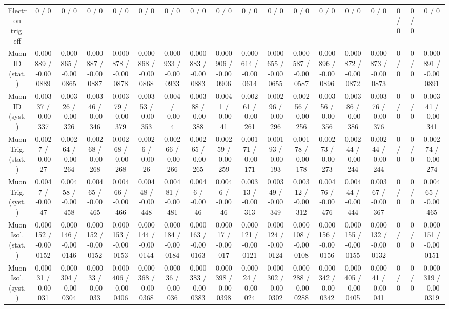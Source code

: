 \documentclass[10pt]{article}
\begin{document}
\begin{table}[htbp]
\begin{center}
\begin{tabular}{|c|c|c|c|c|c|c|c|c|c|c|c|c|c|c|c|c|c|}
  Electron trig. eff & 0 / 0 & 0 / 0 & 0 / 0 & 0 / 0 & 0 / 0 & 0 / 0 & 0 / 0 & 0 / 0 & 0 / 0 & 0 / 0 & 0 / 0 & 0 / 0 & 0 / 0 & 0 / 0 & 0 / 0 & 0 / 0 & 0 / 0 \\ 
  Muon ID (stat.) & 0.000889 / -0.000889 & 0.000865 / -0.000865 & 0.000887 / -0.000887 & 0.000878 / -0.000878 & 0.000868 / -0.000868 & 0.000933 / -0.000933 & 0.000883 / -0.000883 & 0.000906 / -0.000906 & 0.000614 / -0.000614 & 0.000655 / -0.000655 & 0.000587 / -0.000587 & 0.000896 / -0.000896 & 0.000872 / -0.000872 & 0.000873 / -0.000873 & 0 / 0 & 0 / 0 & 0.000891 / -0.000891 \\ 
  Muon ID (syst.) & 0.00337 / -0.00337 & 0.00326 / -0.00326 & 0.00346 / -0.00346 & 0.00379 / -0.00379 & 0.00353 / -0.00353 & 0.004 / -0.004 & 0.00388 / -0.00388 & 0.0041 / -0.0041 & 0.00261 / -0.00261 & 0.00296 / -0.00296 & 0.00256 / -0.00256 & 0.00356 / -0.00356 & 0.00386 / -0.00386 & 0.00376 / -0.00376 & 0 / 0 & 0 / 0 & 0.00341 / -0.00341 \\ 
  Muon Trig. (stat.) & 0.0027 / -0.0027 & 0.00264 / -0.00264 & 0.00268 / -0.00268 & 0.00268 / -0.00268 & 0.0026 / -0.0026 & 0.00266 / -0.00266 & 0.00265 / -0.00265 & 0.00259 / -0.00259 & 0.00171 / -0.00171 & 0.00193 / -0.00193 & 0.00178 / -0.00178 & 0.00273 / -0.00273 & 0.00244 / -0.00244 & 0.00244 / -0.00244 & 0 / 0 & 0 / 0 & 0.00274 / -0.00274 \\ 
  Muon Trig. (syst.) & 0.0047 / -0.0047 & 0.00458 / -0.00458 & 0.00465 / -0.00465 & 0.00466 / -0.00466 & 0.00448 / -0.00448 & 0.00481 / -0.00481 & 0.0046 / -0.0046 & 0.0046 / -0.0046 & 0.00313 / -0.00313 & 0.00349 / -0.00349 & 0.00312 / -0.00312 & 0.00476 / -0.00476 & 0.00444 / -0.00444 & 0.00367 / -0.00367 & 0 / 0 & 0 / 0 & 0.00465 / -0.00465 \\ 
  Muon Isol. (stat.) & 0.000152 / -0.000152 & 0.000146 / -0.000146 & 0.000152 / -0.000152 & 0.000153 / -0.000153 & 0.000144 / -0.000144 & 0.000184 / -0.000184 & 0.000163 / -0.000163 & 0.00017 / -0.00017 & 0.000121 / -0.000121 & 0.000124 / -0.000124 & 0.000108 / -0.000108 & 0.000156 / -0.000156 & 0.000155 / -0.000155 & 0.000132 / -0.000132 & 0 / 0 & 0 / 0 & 0.000151 / -0.000151 \\ 
  Muon Isol. (syst.) & 0.00031 / -0.00031 & 0.000304 / -0.000304 & 0.00033 / -0.00033 & 0.000406 / -0.000406 & 0.000368 / -0.000368 & 0.00036 / -0.00036 & 0.000383 / -0.000383 & 0.000398 / -0.000398 & 0.00024 / -0.00024 & 0.000302 / -0.000302 & 0.000288 / -0.000288 & 0.000342 / -0.000342 & 0.000405 / -0.000405 & 0.00041 / -0.00041 & 0 / 0 & 0 / 0 & 0.000319 / -0.000319 \\ 

\end{tabular}
\end{center}
\end{table}
\end{document}
